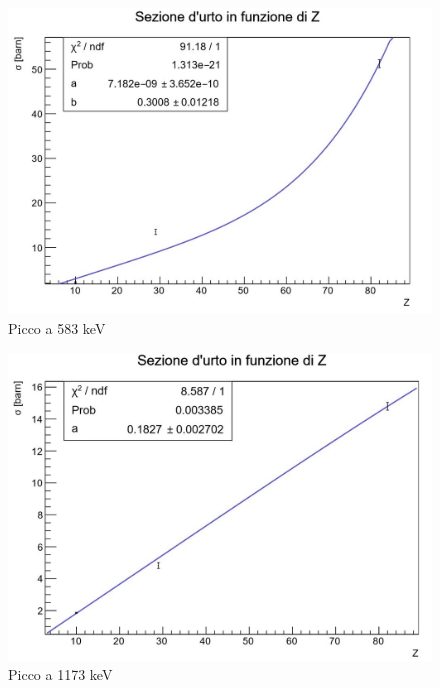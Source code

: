 \documentclass[a4paper,10pt]{article}
\begin{document}
\begin{figure}[H]
    \centering
    \includegraphics[scale=0.6]{grafici/picco583}
    \caption{Picco a 583 keV}
\end{figure}

\begin{figure}[H]
    \centering
    \includegraphics[scale=0.6]{grafici/picco1173}
    \caption{Picco a 1173 keV}
\end{figure}
\end{document}
